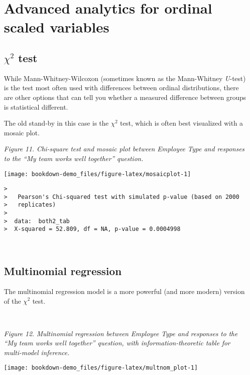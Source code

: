\documentclass[]{book}
\begin{document}
\hypertarget{Advanced}{\chapter{Advanced analytics for ordinal scaled
variables}\label{Advanced}}

\section{\texorpdfstring{\(\chi^2\)
test}{\textbackslash{}chi\^{}2 test}}\label{chi2-test}

While Mann-Whitney-Wilcoxon (sometimes known as the Mann-Whitney
\emph{U}-test) is the test most often used with differences between
ordinal distributions, there are other options that can tell you whether
a measured difference between groups is statistical different.

The old stand-by in this case is the \(\chi^2\) test, which is often
best visualized with a mosaic plot.

\emph{Figure 11. Chi-square test and mosaic plot between Employee Type
and responses to the ``My team works well together'' question.}

\begin{center}\texttt{[image: bookdown-demo\_files/figure-latex/mosaicplot-1]} \end{center}

\begin{verbatim}
>  
>   Pearson's Chi-squared test with simulated p-value (based on 2000
>   replicates)
>  
>  data:  both2_tab
>  X-squared = 52.809, df = NA, p-value = 0.0004998
\end{verbatim}

~

\section{Multinomial regression}\label{multinomial-regression}

The multinomial regression model is a more powerful (and more modern)
version of the \(\chi^2\) test.

~

\emph{Figure 12. Multinomial regression between Employee Type and
responses to the ``My team works well together'' question, with
information-theoretic table for multi-model inference.}

\begin{center}\texttt{[image: bookdown-demo\_files/figure-latex/multnom\_plot-1]} \end{center}
\end{document}
